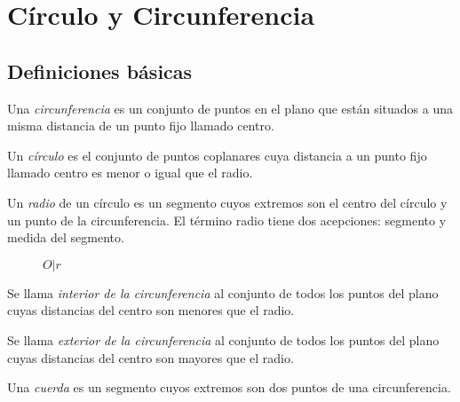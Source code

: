 \clearpage
\section{Círculo y Circunferencia}

\subsection{Definiciones básicas}

\begin{definition}
    Una \textit{circunferencia} es un conjunto de puntos en el plano que están situados a una misma distancia de un punto fijo llamado centro.
\end{definition}

\begin{definition}
    Un \textit{círculo} es el conjunto de puntos coplanares cuya distancia a un punto fijo llamado centro es menor o igual que el radio.
\end{definition}

\begin{definition}
    Un \textit{radio} de un círculo es un segmento cuyos extremos son el centro del círculo y un punto de la circunferencia. El término radio tiene dos acepciones: segmento y medida del segmento.
\end{definition}

\begin{figure}[!h]
    \centering
    
    \caption{$O|r$}
    \label{fig:circunferencia}
\end{figure}

\begin{definition}
    Se llama \textit{interior de la circunferencia} al conjunto de todos los puntos del plano cuyas distancias del centro son menores que el radio.
\end{definition}

\begin{definition}
    Se llama \textit{exterior de la circunferencia} al conjunto de todos los puntos del plano cuyas distancias del centro son mayores que el radio.
\end{definition}

\clearpage

\begin{definition}
    Una \textit{cuerda} es un segmento cuyos extremos son dos puntos de una circunferencia.

    \begin{figure}[!h]
        \centering
        
        \label{fig:cuerda}
    \end{figure}
    
\end{definition}



